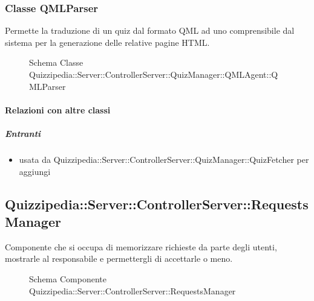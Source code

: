 \subsubsection{Classe QMLParser}
Permette la traduzione di un quiz dal formato QML ad uno comprensibile dal sistema per la generazione delle relative pagine HTML.
\begin{figure}[H]
\centering
\noindent{}
\caption[Schema Classe QMLParser]{Schema Classe Quizzipedia::Server::ControllerServer::QuizManager::QMLAgent::QMLParser}
\end{figure}
\paragraph{Relazioni con altre classi}
\subparagraph{Entranti}
\begin{itemize}
\item usata da Quizzipedia::Server::ControllerServer::QuizManager::QuizFetcher per aggiungi
\end{itemize}
\subsection{Quizzipedia::Server::ControllerServer::RequestsManager}
Componente che si occupa di memorizzare richieste da parte degli utenti, mostrarle al responsabile e permettergli di accettarle o meno.
\begin{figure}[H]
\centering
\noindent{}
\caption[Schema Componente Quizzipedia::Server::ControllerServer::RequestsManager]{Schema Componente Quizzipedia::Server::ControllerServer::RequestsManager}
\end{figure}
